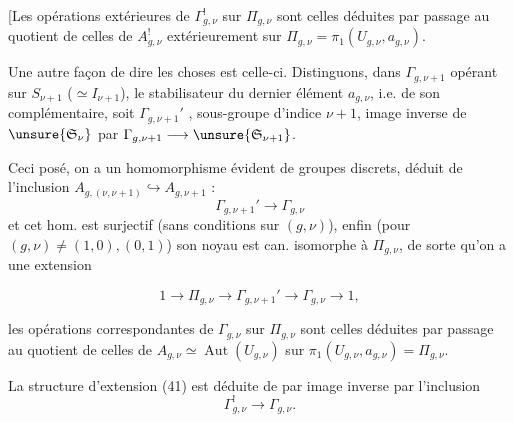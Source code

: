 [Les opérations extérieures de $\Gamma_{g,\nu}^{!}$ sur $\Pi_{g,\nu}$ sont celles déduites par passage au quotient de celles de $A_{g,\nu}^{!}$   extérieurement sur $\Pi_{g,\nu}=\pi_1(U_{g,\nu},a_{g,\nu})$.

Une autre façon de dire les choses est celle-ci. Distinguons, dans $\Gamma_{g,\nu+1}$ opérant sur $S_{\nu+1}$  ($\simeq I_{\nu+1}$), le stabilisateur du dernier élément $a_{g,\nu}$, i.e. de son complémentaire, soit $\Gamma_{g,\nu+1}'$ ,  sous-groupe d'indice $\nu+1$, image inverse de $\unsure{\mathfrak S_\nu}$  par $\Gamma_{g,\nu+1}\longrightarrow\unsure{\mathfrak S_{\nu+1}}$.

Ceci posé, on a un homomorphisme évident de groupes discrets, déduit de l'inclusion  $A_{g,(\nu,\nu+1)}\hookrightarrow A_{g,\nu+1}$ :
\[
\tag{42}
\Gamma_{g,\nu+1}'\longrightarrow\Gamma_{g,\nu}
\]
et cet hom. est surjectif (sans conditions sur $(g,\nu)$), enfin (pour $(g,\nu)\ne(1,0),(0,1)$) son noyau est can. isomorphe à $\Pi_{g,\nu}$, de sorte qu'on a une extension


\[
\tag{43}
1\longrightarrow\Pi_{g,\nu}\longrightarrow\Gamma_{g,\nu+1}'
\longrightarrow\Gamma_{g,\nu}\longrightarrow1,
\]

 les opérations  correspondantes de $\Gamma_{g,\nu}$ sur $\Pi_{g,\nu}$ sont celles déduites par passage au quotient de celles de 
$A_{g,\nu}\simeq\operatorname{Aut}(U_{g,\nu})$ sur $\pi_1(U_{g,\nu},a_{g,\nu})=\Pi_{g,\nu}$.

La structure d'extension (41) est déduite de  par image inverse par l'inclusion
\[
\Gamma_{g,\nu}^{!}\longrightarrow\Gamma_{g,\nu}.
\]

